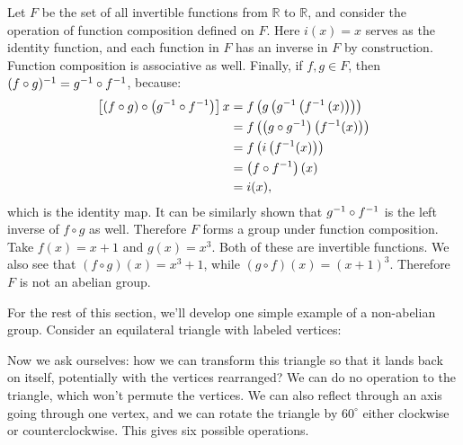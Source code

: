 \begin{example}
Let $F$ be the set of all invertible functions from $\mathbb{R}$ to $\mathbb{R}$, and consider the operation of function composition defined on $F$. Here $i(x) = x$ serves as the identity function, and each function in $F$ has an inverse in $F$ by construction. Function composition is associative as well. Finally, if $f, g \in F$, then $(f \circ g)^{-1} = g^{-1} \circ f^{-1}$, because: 
\begin{align*}
\left[(f \circ g) \circ \left(g^{-1} \circ f^{-1}\right)\right]x &= f\left(g\left(g^{-1}\left(f^{-1} \left(x\right)\right)\right)\right) \\
 &= f\left(\left(g \circ g^{-1}\right)\left(f^{-1}(x)\right)\right) \\
 &= f\left(i\left(f^{-1}(x)\right)\right) \\
 &= \left(f \circ f^{-1}\right)(x) \\
 &= i(x)\mathrm{,}
\end{align*}
which is the identity map. It can be similarly shown that $g^{-1} \circ f^{-1}$ is the left inverse of $f \circ g$ as well. Therefore $F$ forms a group under function composition. Take $f(x) = x+1$ and $g(x) = x^3$. Both of these are invertible functions. We also see that $(f \circ g)(x) = x^3 + 1$, while $(g \circ f)(x) = (x+1)^3$. Therefore $F$ is not an abelian group.
\end{example}

For the rest of this section, we'll develop one simple example of a non-abelian group. Consider an equilateral triangle with labeled vertices:


Now we ask ourselves: how we can transform this triangle so that it lands back on itself, potentially with the vertices rearranged? We can do no operation to the triangle, which won't permute the vertices. We can also reflect through an axis going through one vertex, and we can rotate the triangle by $60^\circ$ either clockwise or counterclockwise. This gives six possible operations.